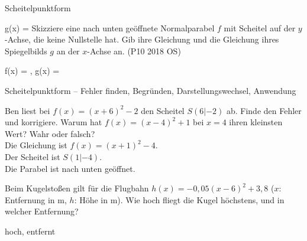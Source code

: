 \begin{aufgabe}{Scheitelpunktform}
\begin{teile}
\begin{ksys}[xmin=-7,xmax=7,ymin=-3,ymax=7]
\end{ksys}
g(x) = \leerfeld
\teil Skizziere eine nach unten geöffnete Normalparabel $f$ mit Scheitel auf der $y$-Achse, die keine Nullstelle hat. Gib ihre Gleichung und die Gleichung ihres Spiegelbilds $g$ an der $x$-Achse an. \hfill (P10 2018 OS) \\

\begin{ksys}[xmin=-4,xmax=4,ymin=-10,ymax=10,ystep=2]
\end{ksys}
f(x) = \leerfeld , g(x) = \leerfeld
\end{teile}
\end{aufgabe}

\begin{aufgabe}{Scheitelpunktform – Fehler finden, Begründen, Darstellungswechsel, Anwendung}
\begin{teile}
\teil Ben liest bei $f(x) = (x + 6)^2 - 2$ den Scheitel $S(6|{-2})$ ab. Finde den Fehler und korrigiere.
\teil Warum hat $f(x) = (x - 4)^2 + 1$ bei $x = 4$ ihren kleinsten Wert?
\teil Wahr oder falsch? \\ Die Gleichung ist $f(x) = (x + 1)^2 - 4$.   \\ Der Scheitel ist $S(1|{-4})$.   \\ Die Parabel ist nach unten geöffnet.  

\begin{ksys}[xmin=-2,xmax=4,ymin=-5,ymax=1,ablesen]
\end{ksys}
\teil Beim Kugelstoßen gilt für die Flugbahn $h(x) = -0{,}05(x - 6)^2 + 3{,}8$ ($x$: Entfernung in m, $h$: Höhe in m). Wie hoch fliegt die Kugel höchstens, und in welcher Entfernung?

\begin{ksys}[xmin=0,xmax=16,ymin=0,ymax=5,xstep=2,xlabel=$x$ in m,ylabel=$h$ in m]
\end{ksys}
\leerfeld[m] hoch, \leerfeld[m] entfernt
\end{teile}
\end{aufgabe}
